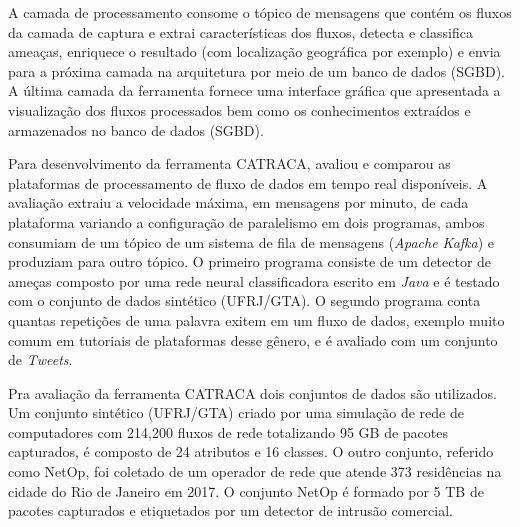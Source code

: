 A camada de processamento consome o tópico de mensagens que contém os fluxos
da camada de captura e extrai características dos fluxos, detecta e classifica ameaças,
enriquece o resultado (com localização geográfica por exemplo) e envia para a
próxima camada na arquitetura por meio de um banco de dados (SGBD).
A última camada da ferramenta fornece uma interface gráfica que apresentada a visualização
dos fluxos processados bem como os conhecimentos extraídos e armazenados no banco de dados (SGBD).

Para desenvolvimento da ferramenta CATRACA,  avaliou e
comparou as plataformas de processamento de fluxo de dados em tempo real
disponíveis.
A avaliação extraiu a velocidade máxima, em mensagens por minuto,
de cada plataforma variando a configuração de paralelismo
em dois programas, ambos consumiam de um tópico de um sistema de fila 
de mensagens (\emph{Apache Kafka}) e produziam para outro tópico.
O primeiro programa consiste de um detector de ameças composto por
uma rede neural classificadora escrito em \emph{Java} e é testado
com o conjunto de dados sintético (UFRJ/GTA).
O segundo programa conta quantas repetições de uma palavra exitem em um 
fluxo de dados, exemplo muito comum em tutoriais de plataformas desse gênero,
e é avaliado com um conjunto de \emph{Tweets}.


Pra avaliação da ferramenta CATRACA dois conjuntos de dados são utilizados.
Um conjunto sintético (UFRJ/GTA) criado por uma simulação de rede de
computadores com 214,200 fluxos de rede totalizando 95 GB de pacotes capturados,
é composto de 24 atributos e 16 classes.
O outro conjunto, referido como NetOp, foi coletado de um operador de rede que
atende 373 residências na cidade do Rio de Janeiro em 2017.
O conjunto NetOp é formado por 5 TB de pacotes capturados e etiquetados por um
detector de intrusão comercial.


